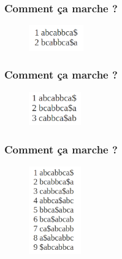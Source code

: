 \documentclass[10pt]{beamer}
\begin{document}
\begin{frame}
  \frametitle{Comment ça marche ?}
  \begin{figure}
    \includegraphics[width=0.21\textwidth]{1_burrows}
  \end{figure}

\end{frame}

\begin{frame}
  \frametitle{Comment ça marche ?}
  \begin{figure}
    \includegraphics[width=0.2\textwidth]{2_burrows}
  \end{figure}

\end{frame}

\begin{frame}
  \frametitle{Comment ça marche ?}
  \begin{figure}
    \includegraphics[width=0.2\textwidth]{3_burrows}
  \end{figure}

\end{frame}
\end{document}

